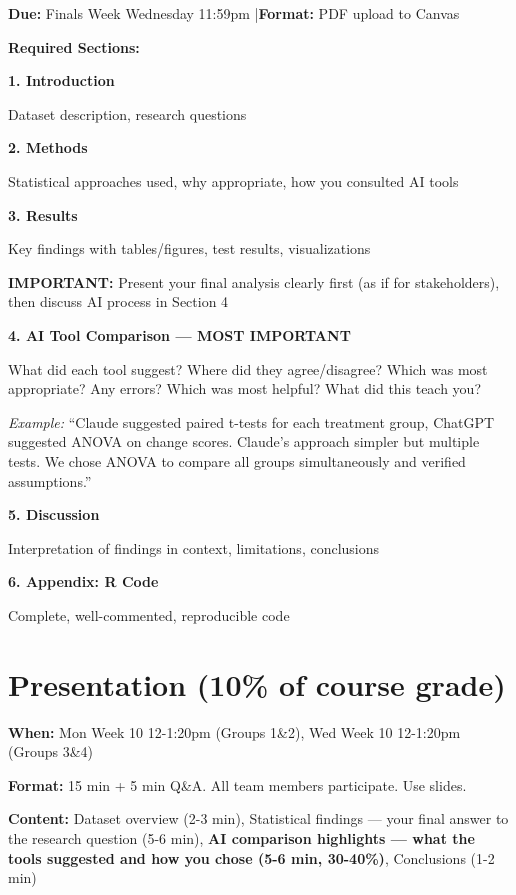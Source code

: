 \documentclass[9pt]{article}
\begin{document}
\textbf{Due:} Finals Week Wednesday 11:59pm \quad|\quad \textbf{Format:} PDF upload to Canvas

\textbf{Required Sections:}

\textbf{1. Introduction}

\quad Dataset description, research questions

\textbf{2. Methods}

\quad Statistical approaches used, why appropriate, how you consulted AI tools

\textbf{3. Results}

\quad Key findings with tables/figures, test results, visualizations

\quad \textbf{IMPORTANT:} Present your final analysis clearly first (as if for stakeholders), then discuss AI process in Section 4

\textbf{4. AI Tool Comparison — MOST IMPORTANT}

\quad What did each tool suggest? Where did they agree/disagree? Which was most appropriate? Any errors? Which was most helpful? What did this teach you?

\quad \textit{Example:} ``Claude suggested paired t-tests for each treatment group, ChatGPT suggested ANOVA on change scores. Claude's approach simpler but multiple tests. We chose ANOVA to compare all groups simultaneously and verified assumptions.''

\textbf{5. Discussion}

\quad Interpretation of findings in context, limitations, conclusions

\textbf{6. Appendix: R Code}

\quad Complete, well-commented, reproducible code

\vspace{2pt}

\section*{Presentation (10\% of course grade)}

\textbf{When:} Mon Week 10 12-1:20pm (Groups 1\&2), Wed Week 10 12-1:20pm (Groups 3\&4)

\textbf{Format:} 15 min + 5 min Q\&A. All team members participate. Use slides.

\textbf{Content:} Dataset overview (2-3 min), Statistical findings — your final answer to the research question (5-6 min), \textbf{AI comparison highlights — what the tools suggested and how you chose (5-6 min, 30-40\%)}, Conclusions (1-2 min)
\end{document}
